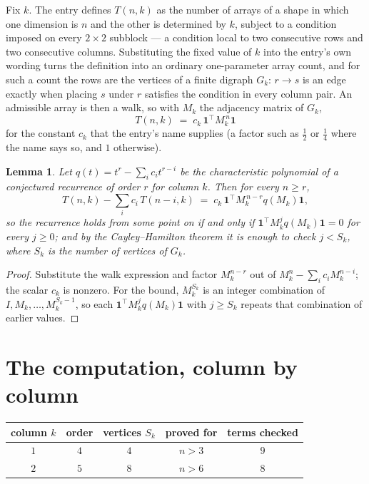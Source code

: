 \documentclass[11pt,a4paper]{article}
\theoremstyle{plain}
\newtheorem{lemma}[theorem]{Lemma}
\theoremstyle{definition}
\begin{document}
Fix $k$. The entry defines $T(n,k)$ as the number of arrays of a shape in which one dimension
is $n$ and the other is determined by $k$, subject to a condition imposed on every
$2\times2$ subblock --- a condition local to two consecutive rows and two consecutive columns.
Substituting the fixed value of $k$ into the entry's own wording turns the definition into an
ordinary one-parameter array count, and for such a count the rows are the vertices of a finite
digraph $G_k$: $r\to s$ is an edge exactly when placing $s$ under $r$ satisfies the condition
in every column pair. An admissible array is then a walk, so with $M_k$ the adjacency matrix
of $G_k$,
\[
T(n,k)\;=\;c_k\,\mathbf{1}^{\!\top}M_k^{\,n}\mathbf{1}
\]
for the constant $c_k$ that the entry's name supplies (a factor such as $\tfrac12$ or
$\tfrac14$ where the name says so, and $1$ otherwise).

\begin{lemma}\label{lem:crit}
Let $q(t)=t^{r}-\sum_i c_it^{r-i}$ be the characteristic polynomial of a conjectured
recurrence of order $r$ for column $k$. Then for every $n\ge r$,
\[
T(n,k)-\sum_i c_i\,T(n-i,k)\;=\;c_k\,\mathbf{1}^{\!\top}M_k^{\,n-r}q(M_k)\mathbf{1},
\]
so the recurrence holds from some point on if and only if
$\mathbf{1}^{\!\top}M_k^{j}q(M_k)\mathbf{1}=0$ for every $j\ge0$; and by the
Cayley--Hamilton theorem it is enough to check $j<S_k$, where $S_k$ is the number of vertices
of $G_k$.
\end{lemma}

\begin{proof}
Substitute the walk expression and factor $M_k^{n-r}$ out of $M_k^{n}-\sum_ic_iM_k^{n-i}$;
the scalar $c_k$ is nonzero. For the bound, $M_k^{S_k}$ is an integer combination of
$I,M_k,\dots,M_k^{S_k-1}$, so each $\mathbf{1}^{\!\top}M_k^{j}q(M_k)\mathbf{1}$ with
$j\ge S_k$ repeats that combination of earlier values.
\end{proof}

\section{The computation, column by column}

\begin{center}
\begin{tabular}{ccccc}
column $k$ & order & vertices $S_k$ & proved for & terms checked \\ \hline
$1$ & $4$ & $4$ & $n>3$ & $9$ \\
$2$ & $5$ & $8$ & $n>6$ & $8$ \\
\end{tabular}
\end{center}
\end{document}
